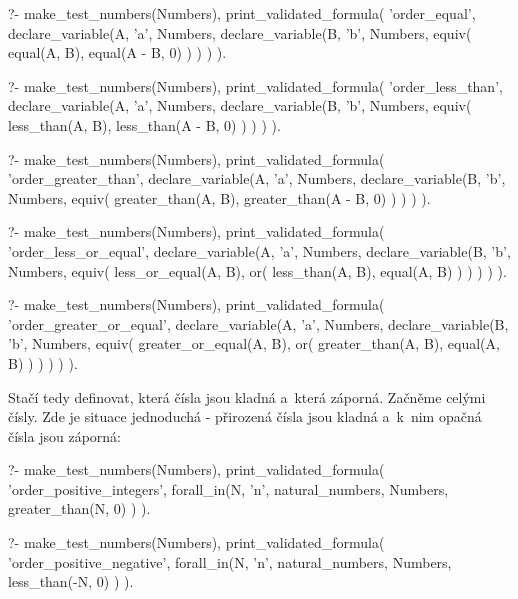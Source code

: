 \begin{fact}
\begin{prolog}
?-	make_test_numbers(Numbers),
	print_validated_formula(
		'order_equal',
		declare_variable(A, 'a', Numbers,
			declare_variable(B, 'b', Numbers,
				equiv(
					equal(A, B),
					equal(A - B, 0)
				)
			)
		)
	).
\end{prolog}
\begin{prolog}
?-	make_test_numbers(Numbers),
	print_validated_formula(
		'order_less_than',
		declare_variable(A, 'a', Numbers,
			declare_variable(B, 'b', Numbers,
				equiv(
					less_than(A, B),
					less_than(A - B, 0)
				)
			)
		)
	).
\end{prolog}
\begin{prolog}
?-	make_test_numbers(Numbers),
	print_validated_formula(
		'order_greater_than',
		declare_variable(A, 'a', Numbers,
			declare_variable(B, 'b', Numbers,
				equiv(
					greater_than(A, B),
					greater_than(A - B, 0)
				)
			)
		)
	).
\end{prolog}
\begin{prolog}
?-	make_test_numbers(Numbers),
	print_validated_formula(
		'order_less_or_equal',
		declare_variable(A, 'a', Numbers,
			declare_variable(B, 'b', Numbers,
				equiv(
					less_or_equal(A, B),
					or(
						less_than(A, B),
						equal(A, B)
					)
				)
			)
		)
	).
\end{prolog}
\begin{prolog}
?-	make_test_numbers(Numbers),
	print_validated_formula(
		'order_greater_or_equal',
		declare_variable(A, 'a', Numbers,
			declare_variable(B, 'b', Numbers,
				equiv(
					greater_or_equal(A, B),
					or(
						greater_than(A, B),
						equal(A, B)
					)
				)
			)
		)
	).
\end{prolog}
\end{fact}

Stačí tedy definovat, která čísla jsou kladná a~která záporná. Začněme celými čísly. Zde je situace jednoduchá - přirozená čísla jsou kladná a~k~nim opačná čísla jsou záporná:

\begin{fact}
\begin{prolog}
?-	make_test_numbers(Numbers),
	print_validated_formula(
		'order_positive_integers',
		forall_in(N, 'n', natural_numbers, Numbers,
			greater_than(N, 0)
		)
	).
\end{prolog}
\begin{prolog}
?-	make_test_numbers(Numbers),
	print_validated_formula(
		'order_positive_negative',
		forall_in(N, 'n', natural_numbers, Numbers,
			less_than(-N, 0)
		)
	).
\end{prolog}
\end{fact}

